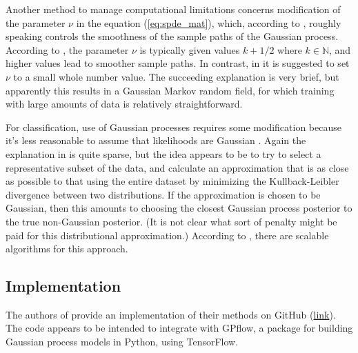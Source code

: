 Another method to manage computational limitations concerns modification of the parameter $\nu$ in the equation (\ref{eq:spde_mat}), which, according to \cite{pmlr-v130-borovitskiy21a}, roughly speaking controls the smoothness of the sample paths of the Gaussian process. According to \cite{garnett_bayesoptbook_2023}, the parameter $\nu$ is typically given values $k + 1/2$ where $k \in \mathbb N$, and higher values lead to smoother sample paths. In contrast, in \cite{pmlr-v130-borovitskiy21a} it is suggested to set $\nu$ to a small whole number value. The succeeding explanation is very brief, but apparently this results in a Gaussian Markov random field, for which training with large amounts of data is relatively straightforward.

For classification, use of Gaussian processes requires some modification because it's less reasonable to assume that likelihoods are Gaussian \cite{rw}. Again the explanation in \cite{pmlr-v130-borovitskiy21a} is quite sparse, but the idea appears to be to try to select a representative subset of the data, and calculate an approximation that is as close as possible to that using the entire dataset by minimizing the Kullback-Leibler divergence between two distributions. If the approximation is chosen to be Gaussian, then this amounts to choosing the closest Gaussian process posterior to the true non-Gaussian posterior. (It is not clear what sort of penalty might be paid for this distributional approximation.) According to \cite{pmlr-v130-borovitskiy21a}, there are scalable algorithms for this approach.

\subsection{Implementation}

The authors of \cite{pmlr-v130-borovitskiy21a} provide an implementation of their methods on GitHub (\href{https://github.com/spbu-math-cs/Graph-Gaussian-Processes}{link}). The code appears to be intended to integrate with GPflow, a package for building Gaussian process models in Python, using TensorFlow.



